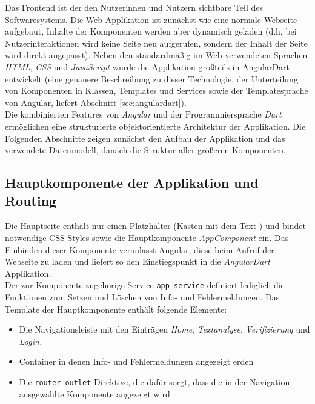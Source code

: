 Das Frontend ist der den Nutzerinnen und Nutzern sichtbare Teil des Softwaresystems. Die Web-Applikation ist zunächst wie eine normale Webseite aufgebaut, Inhalte der Komponenten werden aber dynamisch geladen (d.h. bei Nutzerinteraktionen wird keine Seite neu aufgerufen, sondern der Inhalt der Seite wird direkt angepasst). Neben den standardmäßig im Web verwendeten Sprachen \textit{HTML}, \textit{CSS} und \textit{JavaScript} wurde die Applikation großteils in AngularDart entwickelt (eine genauere Beschreibung zu dieser Technologie, der Unterteilung von Komponenten in Klassen, Templates und Services sowie der Templatesprache von Angular, liefert Abschnitt \ref{sec:angulardart}).\\

Die kombinierten Features von \textit{Angular} und der Programmiersprache \textit{Dart} ermöglichen eine strukturierte objektorientierte Architektur der Applikation. Die Folgenden Abschnitte zeigen zunächst den Aufbau der Applikation und das verwendete Datenmodell, danach die Struktur aller größeren Komponenten.

\subsection{Hauptkomponente der Applikation und Routing}

Die Hauptseite  enthält nur einen Platzhalter (Kasten mit dem Text ) und bindet notwendige CSS Styles sowie die Hauptkomponente \textit{AppComponent} ein. Das Einbinden dieser Komponente veranlasst Angular, diese beim Aufruf der Webseite zu laden und liefert so den Einstiegspunkt in die \textit{AngularDart} Applikation.\\

Der zur Komponente zugehörige Service \texttt{app\_service} definiert lediglich die Funktionen zum Setzen und Löschen von Info- und Fehlermeldungen. Das Template der Hauptkomponente  enthält folgende Elemente:
\begin{itemize}
	\item Die Navigationsleiste mit den Einträgen \textit{Home}, \textit{Textanalyse}, \textit{Verifizierung} und \textit{Login.}
	
	\item Container in denen Info- und Fehlermeldungen angezeigt erden
	\item Die \texttt{router-outlet} Direktive, die dafür sorgt, dass die in der Navigation ausgewählte Komponente angezeigt wird
\end{itemize}


